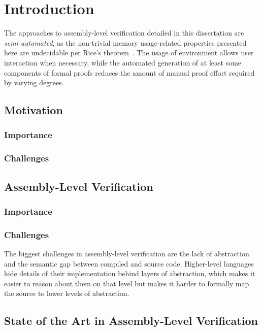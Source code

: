 \chapter{Introduction}


The approaches to assembly-level verification detailed in this dissertation%
are \emph{semi-automated},
as the non-trivial memory usage-related properties presented here are undecidable
per Rice's theorem~\citep{rice1953classes}.
The usage of  environment allows user interaction when necessary,
while the automated generation
of at least some components of formal proofs
reduces the amount of manual proof effort required by varying degrees.

\section{Motivation}
\subsection{Importance}
\subsection{Challenges}

\section{Assembly-Level Verification}
\subsection{Importance}
\subsection{Challenges}
The biggest challenges in assembly-level verification are the lack of abstraction
and the semantic gap between compiled and source code.
Higher-level languages hide details of their implementation
behind layers of abstraction, which makes it easier to reason about them on that level
but makes it harder to formally map the source to lower levels of abstraction.

\section{State of the Art in Assembly-Level Verification}


